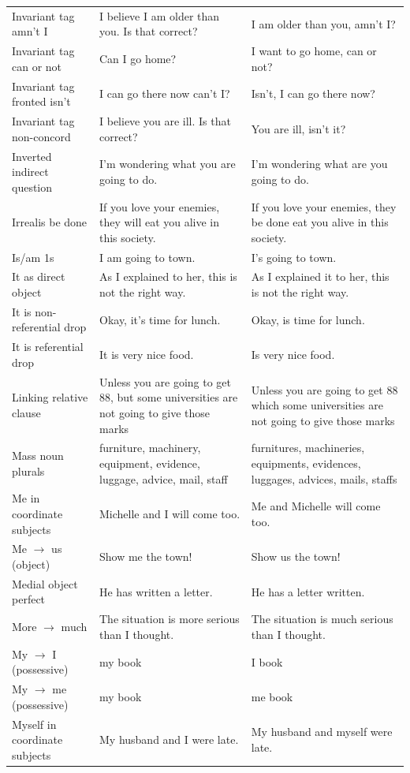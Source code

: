 \begin{longtable}{
  >{\raggedright\arraybackslash}p{3.2cm}
  >{\raggedright\arraybackslash}p{4.8cm}
  >{\raggedright\arraybackslash}p{4.8cm}
}
Invariant tag amn't I & I believe I am older than you. Is that correct? & I am older than you, amn't I? \\
Invariant tag can or not & Can I go home? & I want to go home, can or not? \\
Invariant tag fronted isn't & I can go there now can't I? & Isn't, I can go there now? \\
Invariant tag non-concord & I believe you are ill. Is that correct? & You are ill, isn't it? \\
Inverted indirect question & I'm wondering what you are going to do. & I'm wondering what are you going to do. \\
Irrealis be done & If you love your enemies, they will eat you alive in this society. & If you love your enemies, they be done eat you alive in this society. \\
Is/am 1s & I am going to town. & I's going to town. \\
It as direct object & As I explained to her, this is not the right way. & As I explained it to her, this is not the right way. \\
It is non-referential drop & Okay, it's time for lunch. & Okay, is time for lunch. \\
It is referential drop & It is very nice food. & Is very nice food. \\
Linking relative clause & Unless you are going to get 88, but some universities are not going to give those marks & Unless you are going to get 88 which some universities are not going to give those marks \\
Mass noun plurals & furniture, machinery, equipment, evidence, luggage, advice, mail, staff & furnitures, machineries, equipments, evidences, luggages, advices, mails, staffs \\
Me in coordinate subjects & Michelle and I will come too. & Me and Michelle will come too. \\
Me $\rightarrow$ us (object) & Show me the town! & Show us the town! \\
Medial object perfect & He has written a letter. & He has a letter written. \\
More $\rightarrow$ much & The situation is more serious than I thought. & The situation is much serious than I thought. \\
My $\rightarrow$ I (possessive) & my book & I book \\
My $\rightarrow$ me (possessive) & my book & me book \\
Myself in coordinate subjects & My husband and I were late. & My husband and myself were late. \\

\end{longtable}
